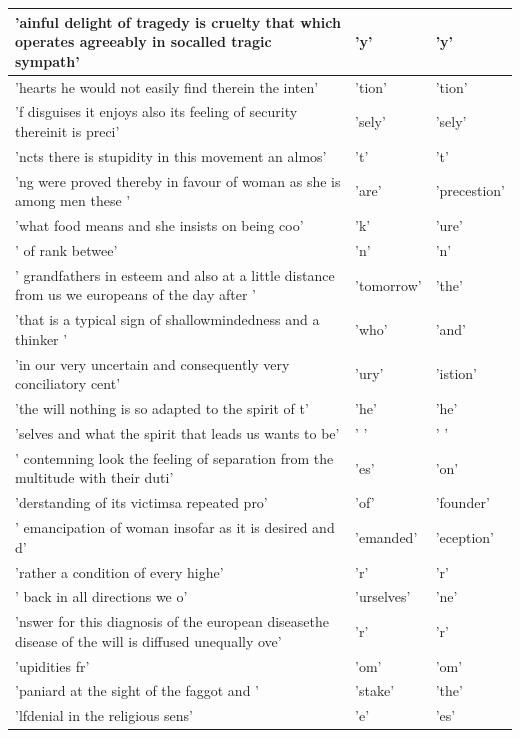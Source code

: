 \documentclass[11pt,a4paper,bibliography=totocnumbered,listof=totocnumbered]{scrartcl}
\begin{document}
\begin{table}[H]
\begin{tabularx}{\textwidth}{X|X|X}
\hline 
'ainful delight of tragedy is cruelty that which operates agreeably in socalled tragic sympath' & 'y' & 'y' \\ 
\hline 
'hearts he would not easily find therein the inten' & 'tion' & 'tion' \\ 
\hline 
'f disguises it enjoys also its feeling of security thereinit is preci' & 'sely' & 'sely' \\ 
\hline 
'ncts there is stupidity in this movement an almos' & 't' & 't' \\ 
\hline 
'ng were proved thereby in favour of woman as she is among men these ' & 'are' & 'precestion' \\ 
\hline 
'what food means and she insists on being coo' & 'k' & 'ure' \\ 
\hline 
' of rank betwee' & 'n' & 'n' \\ 
\hline 
' grandfathers in esteem and also at a little distance from us we europeans of the day after ' & 'tomorrow' & 'the' \\ 
\hline 
'that is a typical sign of shallowmindedness and a thinker ' & 'who' & 'and' \\ 
\hline 
'in our very uncertain and consequently very conciliatory cent' & 'ury' & 'istion' \\ 
\hline 
'the will nothing is so adapted to the spirit of t' & 'he' & 'he' \\ 
\hline 
'selves and what the spirit that leads us wants to be' & ' ' & ' ' \\ 
\hline 
' contemning look the feeling of separation from the multitude with their duti' & 'es' & 'on' \\ 
\hline 
'derstanding of its victimsa repeated pro' & 'of' & 'founder' \\ 
\hline 
' emancipation of woman insofar as it is desired and d' & 'emanded' & 'eception' \\ 
\hline 
'rather a condition of every highe' & 'r' & 'r' \\ 
\hline 
' back in all directions we o' & 'urselves' & 'ne' \\ 
\hline 
'nswer for this diagnosis of the european diseasethe disease of the will is diffused unequally ove' & 'r' & 'r' \\ 
\hline 
'upidities fr' & 'om' & 'om' \\ 
\hline 
'paniard at the sight of the faggot and ' & 'stake' & 'the' \\ 
\hline 
'lfdenial in the religious sens' & 'e' & 'es' \\ 

\end{tabularx}
\end{table}
\end{document}
